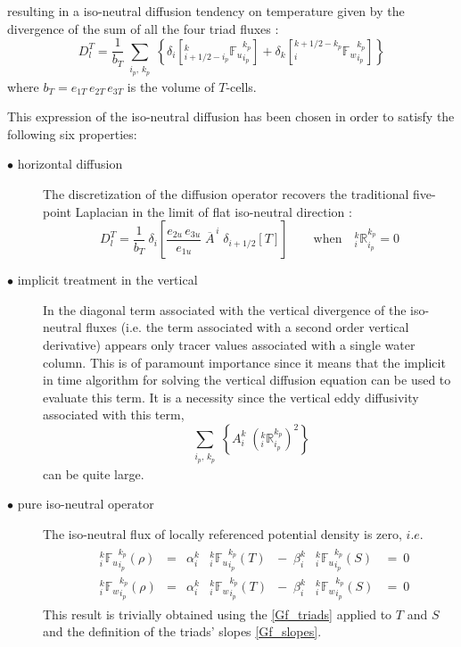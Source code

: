 resulting in a iso-neutral diffusion tendency on temperature given by the divergence 
of the sum of all the four triad fluxes :
\begin{equation} \label{Gf_operator}
D_l^T = \frac{1}{b_T}  \sum_{\substack{i_p,\,k_p}} \left\{  
		 \delta_{i} \left[{_{i+1/2-i_p}^k {\mathbb{F}_u }_{i_p}^{k_p}} \right] 
	     + \delta_{k} \left[ {_i^{k+1/2-k_p} {\mathbb{F}_w}_{i_p}^{k_p}} \right]   \right\}
\end{equation}
where $b_T= e_{1T}\,e_{2T}\,e_{3T}$ is the volume of $T$-cells. 

This expression of the iso-neutral diffusion has been chosen in order to satisfy 
the following six properties:
\begin{description}
\item[$\bullet$ horizontal diffusion] The discretization of the diffusion operator 
recovers the traditional five-point Laplacian in the limit of flat iso-neutral direction :
\begin{equation} \label{Gf_property1a}
D_l^T = \frac{1}{b_T}  \ \delta_{i} 
	\left[ \frac{e_{2u}\,e_{3u}}{e_{1u}} \; \overline{A}^{\,i} \; \delta_{i+1/2}[T] \right] 
\qquad  \text{when} \quad 
	{ _i^k \mathbb{R}_{i_p}^{k_p} }=0
\end{equation}

\item[$\bullet$ implicit treatment in the vertical]  In the diagonal term associated 
with the vertical divergence of the iso-neutral fluxes (i.e. the term associated 
with a second order vertical derivative) appears only tracer values associated 
with a single water column. This is of paramount importance since it means
that the implicit in time algorithm for solving the vertical diffusion equation can 
be used to evaluate this term. It is a necessity since the vertical eddy diffusivity 
associated with this term,  
\begin{equation}
	 \sum_{\substack{i_p, \,k_p}} \left\{  
		A_i^k \; \left(_i^k \mathbb{R}_{i_p}^{k_p}\right)^2
	\right\} 
\end{equation}
can be quite large.

\item[$\bullet$ pure iso-neutral operator]  The iso-neutral flux of locally referenced 
potential density is zero, $i.e.$
\begin{align} \label{Gf_property2}
\begin{matrix}
&{_i^k {\mathbb{F}_u}_{i_p}^{k_p} (\rho)} 
	&=    &\alpha_i^k   &{_i^k {\mathbb{F}_u}_{i_p}^{k_p} } (T) 
	&- \ \;  \beta _i^k    &{_i^k {\mathbb{F}_u}_{i_p}^{k_p} } (S) & = \ 0   \\
&{_i^k {\mathbb{F}_w}_{i_p}^{k_p} (\rho)} 
	&=    &\alpha_i^k   &{_i^k {\mathbb{F}_w}_{i_p}^{k_p} } (T) 
	&- \  \; \beta _i^k    &{_i^k {\mathbb{F}_w}_{i_p}^{k_p} } (S)  &= \ 0
\end{matrix}
\end{align}
This result is trivially obtained using the \eqref{Gf_triads} applied to $T$ and $S$ 
and the definition of the triads' slopes \eqref{Gf_slopes}.


\end{description}
